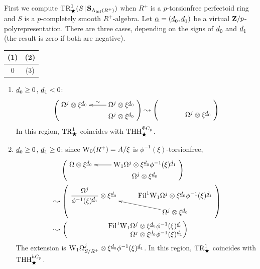 \begin{example}
  First we compute $\TR^1_\rog(S\rel\SAinf{R^+})$ when $R^+$ is a $p$-torsionfree perfectoid ring and $S$ is a $p$-completely smooth $R^+$-algebra. Let $\m\alpha = (\m d_0,\m d_1)$ be a virtual $\Z/p$-polyrepresentation. There are three cases, depending on the signs of $\m d_0$ and $\m d_1$ (the result is zero if both are negative).

  \begin{center}
    \begin{tabular}{c|c}
      (1) & (2)\\\hline
      0 & (3)
    \end{tabular}
  \end{center}

  \begin{enumerate}
    \item $\m d_0\ge0$, $\m d_1<0$:
      \[
        \left(\vcenter{\xymatrix@R=0em{
              \Omega^j \tnsr \xi^{\m d_0} & \Omega^j \tnsr \xi^{\m d_0} \ar[l]_-\sim\\
                                          & \Omega^j \tnsr \xi^{\m d_0}
        }}\right)
        \leadsto
        \left(\vcenter{\xymatrix@R=0em{
              \phantom0 & \phantom0\\
               & \Omega^j \tnsr \xi^{\m d_0}
        }}\right)
      \]
      In this region, $\TR^1_\rog$ coincides with $\THH^{\Phi C_p}_\rog$.

    \item $\m d_0\ge 0$, $\m d_1\ge 0$: since $\rmW_0(R^+)=A/\xi$ is $\phi^{-1}(\xi)$-torsionfree,
      \begin{align*}
        &\phantom{{}\leadsto}\left(\vcenter{\xymatrix@R=0em{
        \Omega \tnsr \xi^{\m d_0} & {\dRW[1]^j \tnsr \xi^{\m d_0} \phi^{-1}(\xi)^{\m d_1}} \ar[l]\\
                                        & {\Omega^j \tnsr \xi^{\m d_0}}
        }}\right)\\
        &\leadsto
        \left(\vcenter{\xymatrix@R=0em{
          \dfrac{\Omega^j}{\phi^{-1}(\xi)^{\m d_1}} \tnsr \xi^{\m d_0} & \Fil^1\dRW[1]^j \tnsr \xi^{\m d_0} \phi^{-1}(\xi)^{\m d_1}\\
                                                                  & \Omega^j \tnsr \xi^{\m d_0} \ar[ul]
        }}\right)\\
        &\leadsto
        \left(\vcenter{\xymatrix@R=0em@C=10em{
        \phantom0 & *!R{\Fil^1\dRW[1]^j \tnsr \xi^{\m d_0} \phi^{-1}(\xi)^{\m d_1}}\\
              \phantom0 & *!R{\Omega^j \tnsr \xi^{\m d_0} \phi^{-1}(\xi)^{\m d_1}}
        }}\right)
      \end{align*}
      The extension is $\dRW[1]^j_{S/R^+} \tnsr \xi^{\m d_0} \phi^{-1}(\xi)^{\m d_1}$. In this region, $\TR^1_\rog$ coincides with $\THH^{hC_p}_\rog$.


\end{enumerate}
\end{example}
